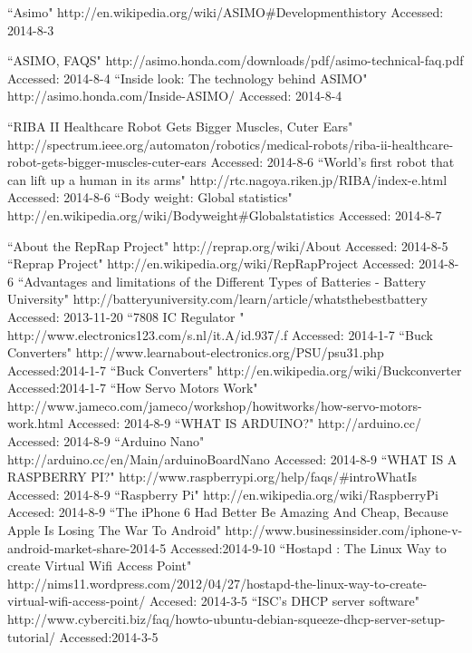\begin{thebibliography}{9}
``Asimo" http://en.wikipedia.org/wiki/ASIMO\#Development\textunderscore history Accessed: 2014-8-3

``ASIMO, FAQS" http://asimo.honda.com/downloads/pdf/asimo-technical-faq.pdf Accessed: 2014-8-4
``Inside look: The technology behind ASIMO" http://asimo.honda.com/Inside-ASIMO/ Accessed: 2014-8-4

``RIBA II Healthcare Robot Gets Bigger Muscles, Cuter Ears" http://spectrum.ieee.org/automaton/robotics/medical-robots/riba-ii-healthcare-robot-gets-bigger-muscles-cuter-ears Accessed: 2014-8-6
``World's first robot that can lift up a human in its arms" http://rtc.nagoya.riken.jp/RIBA/index-e.html Accessed: 2014-8-6
``Body weight: Global statistics" http://en.wikipedia.org/wiki/Body\textunderscore weight\#Global\textunderscore statistics Accessed: 2014-8-7

``About the RepRap Project" http://reprap.org/wiki/About Accessed: 2014-8-5
``Reprap Project" http://en.wikipedia.org/wiki/RepRap\textunderscore Project Accessed: 2014-8-6
``Advantages and limitations of the Different Types of Batteries - Battery University" http://batteryuniversity.com/learn/article/whats\textunderscore the\textunderscore best\textunderscore battery Accessed: 2013-11-20
``7808 IC Regulator " http://www.electronics123.com/s.nl/it.A/id.937/.f Accessed: 2014-1-7
``Buck Converters" http://www.learnabout-electronics.org/PSU/psu31.php Accessed:2014-1-7
``Buck Converters" http://en.wikipedia.org/wiki/Buck\textunderscore converter Accessed:2014-1-7
``How Servo Motors Work" http://www.jameco.com/jameco/workshop/howitworks/how-servo-motors-work.html Accessed: 2014-8-9
``WHAT IS ARDUINO?" http://arduino.cc/ Accessed: 2014-8-9
``Arduino Nano" http://arduino.cc/en/Main/arduinoBoardNano Accessed: 2014-8-9
``WHAT IS A RASPBERRY PI?" http://www.raspberrypi.org/help/faqs/\#introWhatIs Accessed: 2014-8-9
``Raspberry Pi" http://en.wikipedia.org/wiki/Raspberry\textunderscore Pi Accesed: 2014-8-9
``The iPhone 6 Had Better Be Amazing And Cheap, Because Apple Is Losing The War To Android" http://www.businessinsider.com/iphone-v-android-market-share-2014-5 Accessed:2014-9-10
``Hostapd : The Linux Way to create Virtual Wifi Access Point" http://nims11.wordpress.com/2012/04/27/hostapd-the-linux-way-to-create-virtual-wifi-access-point/ Accesed: 2014-3-5
``ISC's DHCP server software" http://www.cyberciti.biz/faq/howto-ubuntu-debian-squeeze-dhcp-server-setup-tutorial/ Accessed:2014-3-5



\end{thebibliography}
